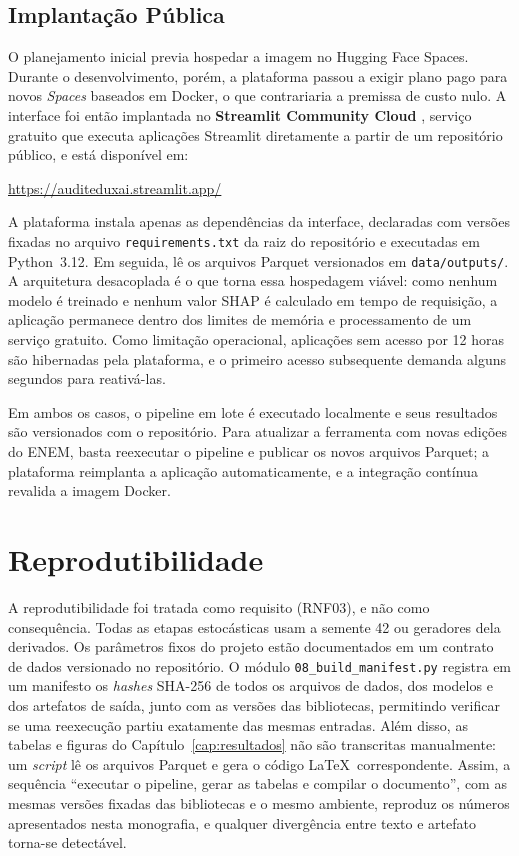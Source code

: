 \subsection{Implantação Pública}
\label{sec:implantacao_publica}

O planejamento inicial previa hospedar a imagem no Hugging Face Spaces. Durante o desenvolvimento, porém, a plataforma passou a exigir plano pago para novos \textit{Spaces} baseados em Docker, o que contrariaria a premissa de custo nulo. A interface foi então implantada no \textbf{Streamlit Community Cloud} \cite{streamlit2026}, serviço gratuito que executa aplicações Streamlit diretamente a partir de um repositório público, e está disponível em:
\begin{center}
\url{https://auditeduxai.streamlit.app/}
\end{center}

A plataforma instala apenas as dependências da interface, declaradas com versões fixadas no arquivo \texttt{requirements.txt} da raiz do repositório e executadas em Python~3.12. Em seguida, lê os arquivos Parquet versionados em \texttt{data/outputs/}. A arquitetura desacoplada é o que torna essa hospedagem viável: como nenhum modelo é treinado e nenhum valor SHAP é calculado em tempo de requisição, a aplicação permanece dentro dos limites de memória e processamento de um serviço gratuito. Como limitação operacional, aplicações sem acesso por 12 horas são hibernadas pela plataforma, e o primeiro acesso subsequente demanda alguns segundos para reativá-las.

Em ambos os casos, o pipeline em lote é executado localmente e seus resultados são versionados com o repositório. Para atualizar a ferramenta com novas edições do ENEM, basta reexecutar o pipeline e publicar os novos arquivos Parquet; a plataforma reimplanta a aplicação automaticamente, e a integração contínua revalida a imagem Docker.

\section{Reprodutibilidade}
\label{sec:reprodutibilidade}

A reprodutibilidade foi tratada como requisito (RNF03), e não como consequência. Todas as etapas estocásticas usam a semente 42 ou geradores dela derivados. Os parâmetros fixos do projeto estão documentados em um contrato de dados versionado no repositório. O módulo \texttt{08\_build\_manifest.py} registra em um manifesto os \textit{hashes} SHA-256 de todos os arquivos de dados, dos modelos e dos artefatos de saída, junto com as versões das bibliotecas, permitindo verificar se uma reexecução partiu exatamente das mesmas entradas. Além disso, as tabelas e figuras do Capítulo~\ref{cap:resultados} não são transcritas manualmente: um \textit{script} lê os arquivos Parquet e gera o código \LaTeX\ correspondente. Assim, a sequência ``executar o pipeline, gerar as tabelas e compilar o documento'', com as mesmas versões fixadas das bibliotecas e o mesmo ambiente, reproduz os números apresentados nesta monografia, e qualquer divergência entre texto e artefato torna-se detectável.

